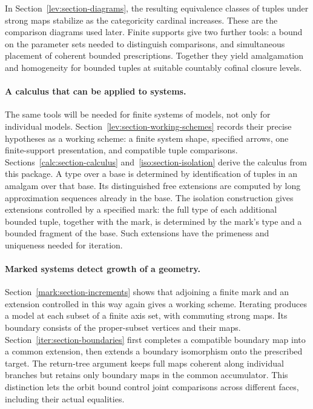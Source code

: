 In Section~\ref{lev:section-diagrams}, the resulting equivalence classes
of tuples under strong maps stabilize as the categoricity cardinal
increases.  These are
the comparison diagrams used later.  Finite supports give two further
tools: a bound on the parameter sets needed to distinguish comparisons,
and simultaneous placement of coherent bounded prescriptions.  Together
they yield amalgamation and homogeneity for bounded tuples at suitable
countably cofinal closure levels.

\paragraph{A calculus that can be applied to systems.}
The same tools will be needed for finite systems of models, not only for
individual models.  Section~\ref{lev:section-working-schemes} records their
precise hypotheses as a working scheme: a finite system shape, specified
arrows, one finite-support presentation, and compatible tuple comparisons.
Sections~\ref{calc:section-calculus} and~\ref{iso:section-isolation} derive
the calculus from this package.  A type over a base is determined by
identification of tuples in an amalgam over that base.  Its distinguished
free extensions are computed by long approximation sequences already in
the base.  The isolation construction gives extensions controlled by
a specified mark: the full type of each additional bounded tuple, together
with the mark, is determined by the mark's type and a bounded fragment of
the base.  Such extensions have the primeness and uniqueness needed for
iteration.

\paragraph{Marked systems detect growth of a geometry.}
Section~\ref{mark:section-increments} shows that adjoining a finite mark
and an extension controlled in this way again gives a working scheme.
Iterating produces a model at each subset of a finite axis set, with
commuting strong maps.  Its boundary consists of the proper-subset
vertices and their maps.  Section~\ref{iter:section-boundaries} first
completes a compatible boundary map into a common extension, then extends
a boundary isomorphism onto the prescribed target.  The return-tree
argument keeps full maps coherent along individual branches but retains
only boundary maps in the common accumulator.  This distinction lets the
orbit bound control joint comparisons across different faces, including
their actual equalities.


